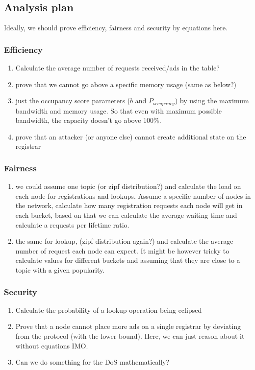 \appendix

\subsection{Analysis plan}
Ideally, we should prove efficiency, fairness and security by equations here. 

\subsubsection{Efficiency}
\begin{enumerate}
    \item Calculate the average number of requests received/ads in the table?
    \item prove that we cannot go above a specific memory usage (same as below?)
    \item just the occupancy score parameters ($b$ and $P_\textit{occupancy}$) by using the maximum bandwidth and memory usage. So that even with maximum possible bandwidth, the capacity doesn't go above 100\%.
    \item prove that an attacker (or anyone else) cannot create additional state on the registrar 
\end{enumerate}

\subsubsection{Fairness}
\begin{enumerate}
    \item we could assume one topic (or zipf distribution?) and calculate the load on each node for registrations and lookups. Assume a specific number of nodes in the network, calculate how many registration requests each node will get in each bucket, based on that we can calculate the average waiting time and calculate a requests per lifetime ratio. 
    \item the same for lookup, (zipf distribution again?) and calculate the average number of request each node can expect. It might be however tricky to calculate values for different buckets and assuming that they are close to a topic with a given popularity.
\end{enumerate}

\subsubsection{Security}
\begin{enumerate}
    \item Calculate the probability of a lookup operation being eclipsed
    \item Prove that a node cannot place more ads on a single registrar by deviating from the protocol (with the lower bound). Here, we can just reason about it without equations IMO. 
    \item Can we do something for the DoS mathematically?
\end{enumerate}

